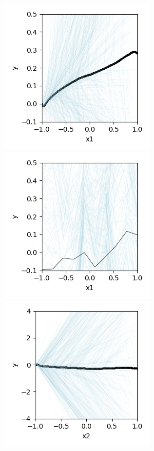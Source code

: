 \documentclass[12pt]{article}
\begin{document}
\begin{figure}[htbp]
\begin{center}
\includegraphics[scale=0.7]{images/bigx_x1_y_stratpd.png}
\includegraphics[scale=0.7]{images/bigx_x1_y_pdp.png}
\\
\includegraphics[scale=0.7]{images/bigx_x2_y_stratpd.png}

\end{center}
\end{figure}
\end{document}
